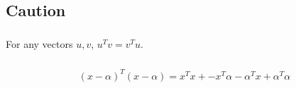 \documentclass[a4paper,10.5pt]{jsarticle}  %
\begin{document}
\subsection{Caution}
\subsubsection{}
For any vectors $u, v$, $u^Tv = v^Tu$.

\subsubsection{}
\begin{align*}
  (x-\alpha)^T (x-\alpha) = x^T x + - x^T \alpha - \alpha^T x + \alpha^T \alpha 
\end{align*}
\end{document}
